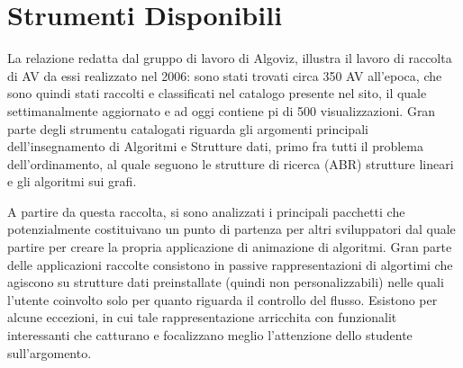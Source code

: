 \section{\label{sec:Strumenti-Disponibili}Strumenti Disponibili}

La relazione \cite{AlgoViz} redatta dal gruppo di lavoro di Algoviz,
illustra il lavoro di raccolta di AV da essi realizzato nel 2006:
sono stati trovati circa 350 AV all'epoca, che sono quindi stati raccolti
e classificati nel catalogo presente nel sito, il quale settimanalmente
aggiornato e ad oggi contiene pi di 500 visualizzazioni. Gran parte
degli strumentu catalogati riguarda gli argomenti principali dell'insegnamento
di Algoritmi e Strutture dati, primo fra tutti il problema dell'ordinamento,
al quale seguono le strutture di ricerca (ABR) strutture lineari e
gli algoritmi sui grafi.

A partire da questa raccolta, si sono analizzati i principali pacchetti
che potenzialmente costituivano un punto di partenza per altri sviluppatori
dal quale partire per creare la propria applicazione di animazione
di algoritmi. Gran parte delle applicazioni raccolte consistono in
passive rappresentazioni di algortimi che agiscono su strutture dati
preinstallate (quindi non personalizzabili) nelle quali l'utente coinvolto
solo per quanto riguarda il controllo del flusso. Esistono per alcune
eccezioni, in cui tale rappresentazione arricchita con funzionalit
interessanti che catturano e focalizzano meglio l'attenzione dello
studente sull'argomento.

